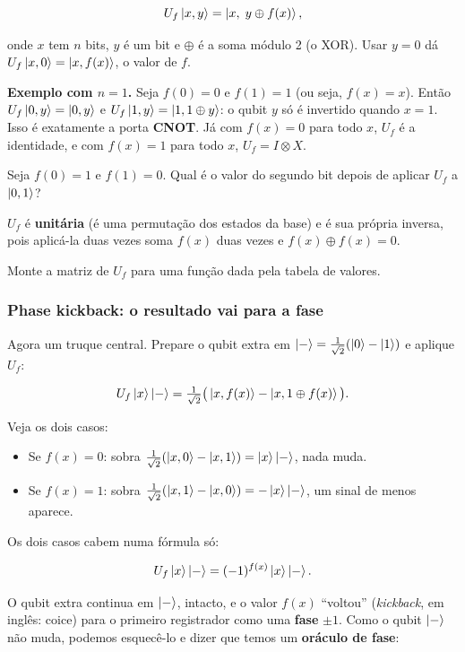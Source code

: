 \[
U_f\left|{x,y}\right> = \left|{x,\; y\oplus f(x)}\right>,
\]

onde \(x\) tem \(n\) bits, \(y\) é um bit e \(\oplus\) é a soma módulo 2 (o XOR). Usar \(y=0\) dá \(U_f\left|{x,0}\right>=\left|{x,f(x)}\right>\), o valor de \(f\).

\textbf{Exemplo com \(n=1\).} Seja \(f(0)=0\) e \(f(1)=1\) (ou seja, \(f(x)=x\)). Então \(U_f\left|{0,y}\right>=\left|{0,y}\right>\) e \(U_f\left|{1,y}\right>=\left|{1,1\oplus y}\right>\): o qubit \(y\) só é invertido quando \(x=1\). Isso é exatamente a porta \textbf{CNOT}. Já com \(f(x)=0\) para todo \(x\), \(U_f\) é a identidade, e com \(f(x)=1\) para todo \(x\), \(U_f=I\otimes X\).

Seja \(f(0)=1\) e \(f(1)=0\). Qual é o valor do segundo bit depois de aplicar \(U_f\) a \(\left|{0,1}\right>\)?

\(U_f\) é \textbf{unitária} (é uma permutação dos estados da base) e é sua própria inversa, pois aplicá-la duas vezes soma \(f(x)\) duas vezes e \(f(x)\oplus f(x)=0\).

Monte a matriz de \(U_f\) para uma função dada pela tabela de valores.

\subsubsection{Phase kickback: o resultado vai para a fase}\label{phase-kickback-o-resultado-vai-para-a-fase}

Agora um truque central. Prepare o qubit extra em \(\left|{-}\right>=\tfrac{1}{\sqrt2}(\left|{0}\right>-\left|{1}\right>)\) e aplique \(U_f\):

\[
U_f\left|{x}\right>\left|{-}\right>=\tfrac{1}{\sqrt2}\big(\left|{x,f(x)}\right>-\left|{x,1\oplus f(x)}\right>\big).
\]

Veja os dois casos:

\begin{itemize}
\tightlist
\item
  Se \(f(x)=0\): sobra \(\tfrac{1}{\sqrt2}(\left|{x,0}\right>-\left|{x,1}\right>)=\left|{x}\right>\left|{-}\right>\), nada muda.
\item
  Se \(f(x)=1\): sobra \(\tfrac{1}{\sqrt2}(\left|{x,1}\right>-\left|{x,0}\right>)=-\left|{x}\right>\left|{-}\right>\), um sinal de menos aparece.
\end{itemize}

Os dois casos cabem numa fórmula só:

\[
U_f\left|{x}\right>\left|{-}\right>=(-1)^{f(x)}\left|{x}\right>\left|{-}\right>.
\]

O qubit extra continua em \(\left|{-}\right>\), intacto, e o valor \(f(x)\) ``voltou'' (\emph{kickback}, em inglês: coice) para o primeiro registrador como uma \textbf{fase} \(\pm1\). Como o qubit \(\left|{-}\right>\) não muda, podemos esquecê-lo e dizer que temos um \textbf{oráculo de fase}:

